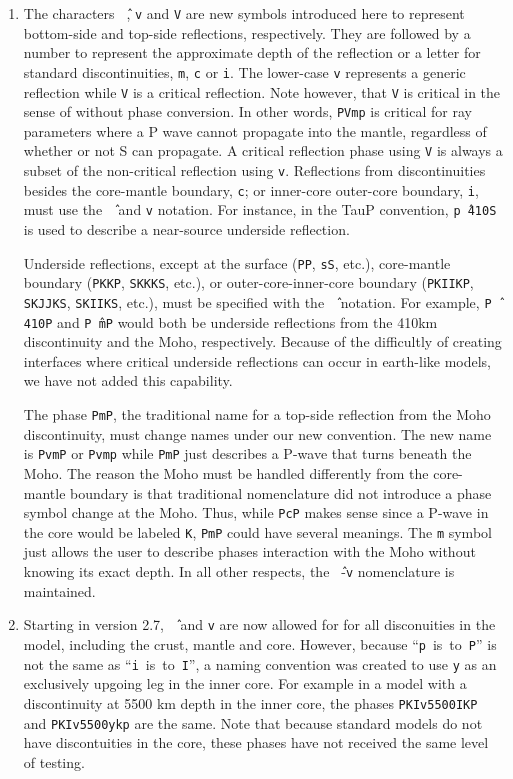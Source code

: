 \begin{enumerate}
\item \label{carrotv}
The characters \texttt{\^\,}, \texttt{v} and \texttt{V} are new symbols introduced here to
represent bottom-side and top-side reflections, respectively.
They are followed by a number to
represent the approximate depth of the reflection or
a letter for standard discontinuities, \texttt{m}, \texttt{c} or \texttt{i}.
The lower-case \texttt{v} represents a generic reflection while \texttt{V} is
a critical reflection. Note however, that  \texttt{V} is critical in the sense of
without phase conversion. In other words, \texttt{PVmp} is critical for ray parameters
where a P wave cannot propagate into the mantle, regardless of whether
or not S can propagate. A critical reflection phase using \texttt{V} is always
a subset of the non-critical reflection using \texttt{v}.
Reflections from discontinuities besides the
core-mantle boundary, \texttt{c};
or inner-core outer-core boundary, \texttt{i}, must use the \texttt{\^\,}
and \texttt{v} notation.
For instance, in the TauP convention, \texttt{p\^\,410S} is used to describe
a near-source underside reflection.

Underside reflections, except at the
surface (\texttt{PP}, \texttt{sS}, etc.),
core-mantle boundary (\texttt{PKKP}, \texttt{SKKKS}, etc.), or
outer-core-inner-core boundary (\texttt{PKIIKP}, \texttt{SKJJKS},
\texttt{SKIIKS}, etc.), must
be specified with the \texttt{\^\,} notation.
For example, \texttt{P\^\,410P} and
\texttt{P\^\,mP} would both be underside
reflections from the 410km discontinuity and the Moho, respectively.
Because of the difficultly of creating interfaces where critical underside reflections
can occur in earth-like models, we have not added this capability.

The phase \texttt{PmP}, the traditional name for a top-side reflection from the Moho
discontinuity, must change names under our new convention.
The new name is \texttt{PvmP} or \texttt{Pvmp}
while \texttt{PmP} just describes a P-wave that turns beneath the Moho.
The reason the Moho must be handled differently from the core-mantle boundary is that
traditional nomenclature did not introduce a phase symbol change at the Moho.
Thus, while \texttt{PcP} makes sense since a P-wave in the core would be labeled
\texttt{K}, \texttt{PmP} could have several meanings.
The \texttt{m} symbol just allows the user to describe phases interaction with the Moho
without knowing its exact depth.
In all other respects, the \texttt{\^\,}-\texttt{v} nomenclature is maintained.

\item
Starting in version 2.7, \texttt{\^\,} and \texttt{v} are now allowed
for for all disconuities in the model, including
the crust, mantle and core.
However, because
``\texttt{p}~is~to~\texttt{P}'' is not the same as
``\texttt{i}~is~to~\texttt{I}'',
a naming convention was created to use \texttt{y} as an exclusively
upgoing leg in the inner core. For example in a model with a discontinuity at 5500 km depth in the inner core, the phases
\texttt{PKIv5500IKP} and \texttt{PKIv5500ykp} are the same. Note that
because standard models do not have discontuities in the core, these
phases have not received the same level of testing.


\end{enumerate}
